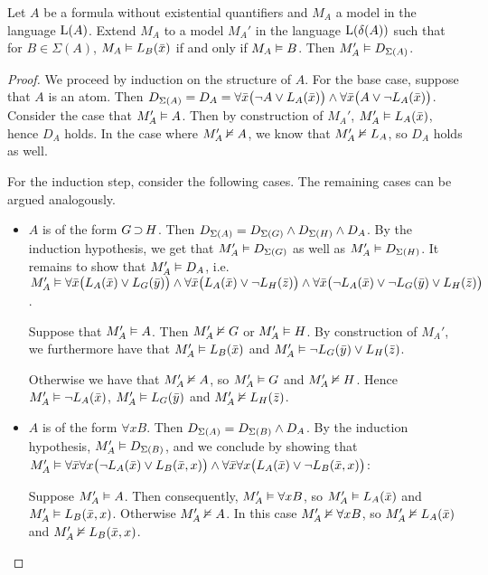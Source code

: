 \begin{lemma}
	\label{lemma:m_prime}
	Let $A$ be a formula without existential quantifiers and $M_A$ a model in the language $\operatorname{L}(A)$.
	Extend $M_A$ to a model $M_A'$ in the language $\operatorname{L}(\delta(A))$ such that for $B\in\Sigma(A)$, $M_A\vDash L_B(\bar x)$ if and only if $M_A \vDash B$.
	Then $M_A' \vDash D_{\Sigma(A)}$.
\end{lemma}
\begin{proof}
	We proceed by induction on the structure of $A$.
	For the base case, suppose that $A$ is an atom. 
	Then $D_{\Sigma(A)} = D_A  =\allowbreak \forall \bar x \big(\lnot A \lor L_A(\bar x)\big) \land\allowbreak \forall \bar x \big(A \lor \lnot L_A(\bar x)\big)$. 
	Consider the case that $M_A' \vDash A$. Then by construction of $M_A'$, $M_A'\vDash L_A(\bar x)$, hence $D_A$ holds.
	In the case where $M_A' \nvDash A$, we know that $M_A' \nvDash L_A$, so $D_A$ holds as well.

	For the induction step, consider the following cases. The remaining cases can be argued analogously.
	\begin{itemize}
		\item $A$ is of the form $G \operatorname{\supset} H$. 
			Then $D_{\Sigma(A)} =
			D_{\Sigma(G)} \land
			D_{\Sigma(H)} \land D_A$.
			By the induction hypothesis, we get that $M_A' \vDash D_{\Sigma(G)}$ as well as $M_A' \vDash D_{\Sigma(H)}$.
			It remains to show that $M_A' \vDash D_A$, i.e.~
			$M_A' \vDash \forall \bar x \big(L_A(\bar x) \lor L_G(\bar y)\big) \land
			\forall \bar x \big(L_A(\bar x) \lor \lnot L_H(\bar z)\big) \land \forall \bar x \big(\lnot L_A(\bar x) \lor \lnot L_G(\bar y) \lor L_H(\bar z)\big)  $.

			Suppose that $M_A' \vDash A$.
			Then $M_A' \nvDash G$ or $M_A' \vDash H$. By construction of $M_A'$, we furthermore have that $M_A' \vDash L_B(\bar x)$ and $M_A' \vDash \lnot L_G(\bar y) \lor L_H(\bar z)$.

			Otherwise we have that $M_A' \nvDash A$, so $M_A' \vDash G$ and $M_A' \nvDash H$.
			Hence $M_A' \vDash \lnot  L_A(\bar x)$, $M_A' \vDash L_G(\bar y)$ and $M_A' \nvDash L_H(\bar z)$.

		\item $A$ is of the form $\forall x B$.
			Then $D_{\Sigma(A)} =
			D_{\Sigma(B)} \land D_A$.
			By the induction hypothesis,  $M_A' \vDash D_{\Sigma(B)}$, and we conclude by showing that $M_A' \vDash \forall \bar x \forall x \big(\lnot L_A(\bar x) \lor L_B(\bar x, x)\big) \land \forall \bar x \forall x \big(L_A(\bar x) \lor \lnot L_B(\bar x, x)\big)$:


			Suppose $M_A' \vDash A$. Then consequently, $M_A' \vDash \forall x B$, so $M_A' \vDash L_A(\bar x)$ and $M_A' \vDash L_B(\bar x, x)$.
			Otherwise $M_A' \nvDash A$. In this case $M_A' \nvDash \forall x B$, so $M_A' \nvDash L_A(\bar x)$ and $M_A' \nvDash L_B(\bar x, x)$.
			\qedhere
	\end{itemize}

\end{proof}




